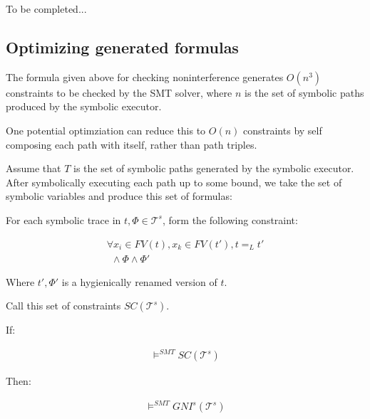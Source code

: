 \documentclass[conference]{IEEEtran}
\theoremstyle{definition}
\newcommand{\tr}{t\xspace}
\newcommand{\tsets}{\ensuremath{\mathcal{T}^s}\xspace}
\begin{document}
\begin{Proof}
  To be completed...
\end{Proof}

\subsection{Optimizing generated formulas}

The formula given above for checking noninterference generates
$O(n^3)$ constraints to be checked by the SMT solver, where $n$ is the
set of symbolic paths produced by the symbolic executor.

One potential optimziation can reduce this to $O(n)$ constraints by
self composing each path with itself, rather than path triples.

Assume that $T$ is the set of symbolic paths generated by the symbolic
executor.  After symbolically executing each path up to some bound, we
take the set of symbolic variables and produce this set of formulas:

\begin{Definition}
  For each symbolic trace in $\tr,\Phi \in \tsets$, form the following
  constraint:

  \begin{displaymath}
    \begin{array}{c}
      \forall x_i \in FV(\tr), x_k \in FV(\tr'), \tr =_L \tr' \\
      ~~\land \Phi \land \Phi'
    \end{array}
  \end{displaymath}
  
  Where $\tr',\Phi'$ is a hygienically renamed version of $\tr$.
  
  Call this set of constraints $SC(\tsets)$.
\end{Definition}

\begin{Theorem}[$SC(\tsets)$ implies $GNI^s(\tsets)$]
  If:
  
  \begin{displaymath}
    \begin{array}{c}
      \models^{SMT} SC(\tsets)
    \end{array}
  \end{displaymath}
  
  Then:

  \begin{displaymath}
    \begin{array}{c}
      \models^{SMT} GNI^s(\tsets)
    \end{array}
  \end{displaymath}
\end{Theorem}
\end{document}
